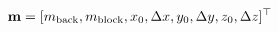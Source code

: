 \begin{equation}
\mathbf{m} = [m_{\rm back}, m_{\rm block}, x_0, \Delta x, y_0, \Delta y, z_0, \Delta z]^\top
\label{eq:model_block}
\end{equation}
